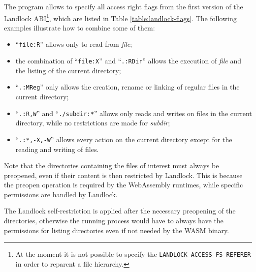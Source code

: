 The program allows to specify all access right flags from the first version of the Landlock
ABI\footnote{At the moment it is not possible to specify the \texttt{LANDLOCK\_ACCESS\_FS\_REFERER} in order to reparent a file hierarchy.},
which are listed in Table \ref{table:landlock-flags}.
The following examples illustrate how to combine some of them:
\begin{itemize}
  \item ``\texttt{file:R}'' allows only to read from \textit{file};
  \item the combination of ``\texttt{file:X}'' and ``\texttt{.:RDir}'' allows the execution of \textit{file} and the listing of the current directory;
  \item ``\texttt{.:MReg}'' only allows the creation, rename or linking of regular files in the current directory;
  \item ``\texttt{.:R,W}'' and ``\texttt{./subdir:*}'' allows only reads and writes on files in the current directory, while no restrictions are
        made for \textit{subdir};
  \item ``\texttt{.:*,-X,-W}'' allows every action on the current directory except for the reading and writing of files.
\end{itemize}

Note that the directories containing the files of interest must always be preopened,
even if their content is then restricted by Landlock. This is because the preopen operation
is required by the WebAssembly runtimes, while specific permissions are handled by Landlock.

The Landlock self-restriction is applied after the necessary preopening of the directories,
otherwise the running process would have to always have the permissions for listing directories even if
not needed by the WASM binary.

\vspace*{1cm}

